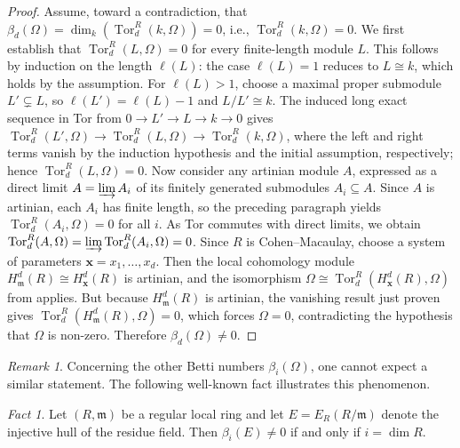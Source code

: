 \documentclass[11pt,a4paper]{amsart}
\numberwithin{equation}{section}
\theoremstyle{definition}
\theoremstyle{remark}
\newtheorem{remark}[theorem]{Remark}
\newtheorem{fact}[theorem]{Fact}
\begin{document}
	
\begin{proof}
Assume, toward a contradiction, that \(\beta_d(\Omega)=\dim_k(\operatorname{Tor}_d^R(k,\Omega))=0\), i.e., \(\operatorname{Tor}_d^R(k,\Omega)=0\). We first establish that \(\operatorname{Tor}_d^R(L,\Omega)=0\) for every finite-length module \(L\). This follows by induction on the length \(\ell(L)\): the case \(\ell(L)=1\) reduces to \(L\cong k\), which holds by the assumption. For \(\ell(L)>1\), choose a maximal proper submodule \(L'\subsetneq L\), so \(\ell(L')=\ell(L)-1\) and \(L/L'\cong k\). The induced long exact sequence in Tor from \(0\to L'\to L\to k\to 0\) gives \(\operatorname{Tor}_d^R(L',\Omega)\to \operatorname{Tor}_d^R(L,\Omega)\to \operatorname{Tor}_d^R(k,\Omega)\), where the left and right terms vanish by the induction hypothesis and the initial assumption, respectively; hence \(\operatorname{Tor}_d^R(L,\Omega)=0\). Now consider any artinian module \(A\), expressed as a direct limit \(A=\varinjlim A_i\) of its finitely generated submodules \(A_i\subseteq A\). Since \(A\) is artinian, each \(A_i\) has finite length, so the preceding paragraph yields \(\operatorname{Tor}_d^R(A_i,\Omega)=0\) for all \(i\). As Tor commutes with direct limits, we obtain \(\operatorname{Tor}_d^R(A,\Omega)=\varinjlim \operatorname{Tor}_d^R(A_i,\Omega)=0\). Since \(R\) is Cohen--Macaulay, choose a system of parameters \(\mathbf{x}=x_1,\dots,x_d\). Then the local cohomology module \(H_{\mathfrak{m}}^d(R)\cong H_{\mathbf{x}}^d(R)\) is artinian, and the isomorphism \(\Omega\cong \operatorname{Tor}_d^R(H_{\mathbf{x}}^d(R),\Omega)\) from \cite[Proposition 7.8]{moh4} applies. But because \(H_{\mathfrak{m}}^d(R)\) is artinian, the vanishing result just proven gives \(\operatorname{Tor}_d^R(H_{\mathfrak{m}}^d(R),\Omega)=0\), which forces \(\Omega=0\), contradicting the hypothesis that \(\Omega\) is non-zero. Therefore \(\beta_d(\Omega)\neq 0\).
\end{proof}
	
\begin{remark}
Concerning the other Betti numbers \(\beta_i(\Omega)\), one cannot expect a similar statement. The following well-known fact illustrates this phenomenon.
\end{remark}
	
\begin{fact}
Let \((R,\mathfrak{m})\) be a regular local ring and let \(E=E_R(R/\mathfrak{m})\) denote the injective hull of the residue field. Then
$\beta_i(E)\neq 0$ if and only if $ i=\dim R.$ 
	\end{fact}
	
\end{document}
